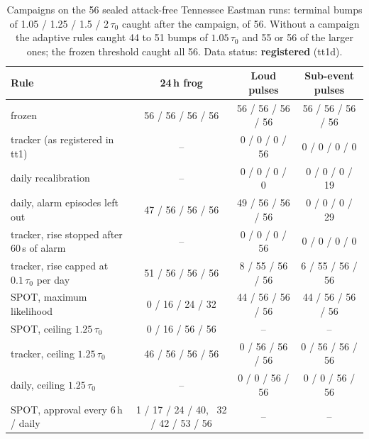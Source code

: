 \documentclass[sigconf]{acmart}
\begin{document}
\begin{table}[t]
\caption{Campaigns on the 56 sealed attack-free Tennessee Eastman runs: terminal bumps of 1.05 / 1.25 /
1.5 / 2\,$\tau_0$ caught after the campaign, of 56. Without a campaign the adaptive rules caught 44 to 51
bumps of $1.05\,\tau_0$ and 55 or 56 of the larger ones; the frozen threshold caught all 56. Data
status: \textbf{registered} (tt1d).}
\label{tab:tepcampaigns}
\begin{tabularx}{\textwidth}{@{}Lccc@{}}
\toprule
Rule & 24\,h frog & Loud pulses & Sub-event pulses \\
\midrule
frozen & 56 / 56 / 56 / 56 & 56 / 56 / 56 / 56 & 56 / 56 / 56 / 56 \\
tracker (as registered in tt1) & -- & 0 / 0 / 0 / 56 & 0 / 0 / 0 / 0 \\
daily recalibration & -- & 0 / 0 / 0 / 0 & 0 / 0 / 0 / 19 \\
daily, alarm episodes left out & 47 / 56 / 56 / 56 & 49 / 56 / 56 / 56 & 0 / 0 / 0 / 29 \\
tracker, rise stopped after 60\,s of alarm & -- & 0 / 0 / 0 / 56 & 0 / 0 / 0 / 0 \\
tracker, rise capped at $0.1\,\tau_0$ per day & 51 / 56 / 56 / 56 & 8 / 55 / 56 / 56 & 6 / 55 / 56 / 56 \\
SPOT, maximum likelihood & 0 / 16 / 24 / 32 & 44 / 56 / 56 / 56 & 44 / 56 / 56 / 56 \\
SPOT, ceiling $1.25\,\tau_0$ & 0 / 16 / 56 / 56 & -- & -- \\
tracker, ceiling $1.25\,\tau_0$ & 46 / 56 / 56 / 56 & 0 / 56 / 56 / 56 & 0 / 56 / 56 / 56 \\
daily, ceiling $1.25\,\tau_0$ & -- & 0 / 0 / 56 / 56 & 0 / 0 / 56 / 56 \\
SPOT, approval every 6\,h / daily & 1 / 17 / 24 / 40, \ 32 / 42 / 53 / 56 & -- & -- \\
\bottomrule
\end{tabularx}
\end{table}
\end{document}

